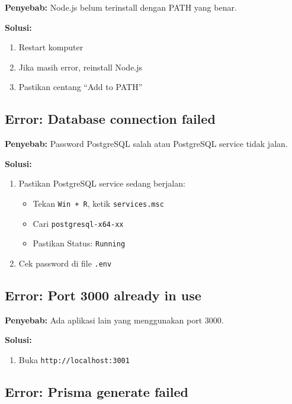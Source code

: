\documentclass[12pt,a4paper]{article}
\begin{document}
\textbf{Penyebab:} Node.js belum terinstall dengan PATH yang benar.

\textbf{Solusi:}
\begin{enumerate}
    \item Restart komputer
    \item Jika masih error, reinstall Node.js
    \item Pastikan centang ``Add to PATH''
\end{enumerate}

\subsection{Error: Database connection failed}

\textbf{Penyebab:} Password PostgreSQL salah atau PostgreSQL service tidak jalan.

\textbf{Solusi:}
\begin{enumerate}
    \item Pastikan PostgreSQL service sedang berjalan:
    \begin{itemize}
        \item Tekan \texttt{Win + R}, ketik \texttt{services.msc}
        \item Cari \texttt{postgresql-x64-xx}
        \item Pastikan Status: \texttt{Running}
    \end{itemize}
    \item Cek password di file \texttt{.env}
\end{enumerate}

\subsection{Error: Port 3000 already in use}

\textbf{Penyebab:} Ada aplikasi lain yang menggunakan port 3000.

\textbf{Solusi:}
\begin{enumerate}
     port berbeda:
\begin{lstlisting}[language=bash]
set PORT=3001 && npm run dev
\end{lstlisting}
    \item Buka \texttt{http://localhost:3001}
\end{enumerate}

\subsection{Error: Prisma generate failed}
\end{document}

